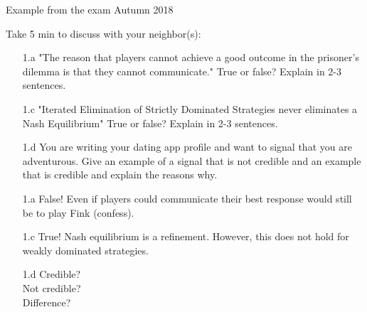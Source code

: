 \begin{frame}{Example from the exam Autumn 2018}
\begin{multicols}{2}\color{lightgray}
  Take 5 min to discuss with your neighbor(s):
  \begin{itemize}\color{lightgray}
    \item[\color{lightgray}1.a] "The reason that players cannot achieve a good outcome in the prisoner’s dilemma is that they cannot communicate." True or false? Explain in 2-3 sentences.
    \item[\color{lightgray}1.c] "Iterated Elimination of Strictly Dominated Strategies never eliminates a Nash Equilibrium" True or false? Explain in 2-3 sentences.
    \item[1.d] \color{black}You are writing your dating app profile and want to signal that you are adventurous. Give an example of a signal that is not credible and an example that is credible and explain the reasons why.
  \end{itemize}
\vfill\null
\columnbreak
\begin{itemize}\color{lightgray}
  \item[\color{lightgray}1.a] False! Even if players could communicate their best response would still be to play Fink (confess).
  \item[\color{lightgray}1.c] True! Nash equilibrium is a refinement. However, this does not hold for
weakly dominated strategies.
  \item[1.d] \color{black} Credible? \\ Not credible? \\ Difference?
\end{itemize}
\end{multicols}
\end{frame}


